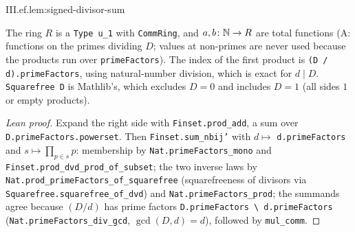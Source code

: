 \begin{lemma}
\end{lemma}
\begin{tfformal}{III.ef.lem:signed-divisor-sum}
\begin{tffidelity}
The ring $R$ is a \texttt{Type u\_1} with \texttt{CommRing}, and $a,b\colon\mathbb{N}\to R$ are total functions (A: functions on the primes dividing $D$; values at non-primes are never used because the products run over \texttt{primeFactors}). The index of the first product is \texttt{(D / d).primeFactors}, using natural-number division, which is exact for $d\mid D$. \texttt{Squarefree D} is Mathlib's, which excludes $D=0$ and includes $D=1$ (all sides $1$ or empty products).
\end{tffidelity}
\end{tfformal}
\begin{proof}[Lean proof]
Expand the right side with \texttt{Finset.prod\_add}, a sum over \texttt{D.primeFactors.powerset}. Then \texttt{Finset.sum\_nbij'} with $d\mapsto$ \texttt{d.primeFactors} and $s\mapsto\prod_{p\in s}p$: membership by \texttt{Nat.primeFactors\_mono} and \texttt{Finset.prod\_dvd\_prod\_of\_subset}; the two inverse laws by \texttt{Nat.prod\_primeFactors\_of\_squarefree} (squarefreeness of divisors via \texttt{Squarefree.squarefree\_of\_dvd}) and \texttt{Nat.primeFactors\_prod}; the summands agree because $(D/d)$ has prime factors \texttt{D.primeFactors \textbackslash\ d.primeFactors} (\texttt{Nat.primeFactors\_div\_gcd}, $\gcd(D,d)=d$), followed by \texttt{mul\_comm}.
\end{proof}


